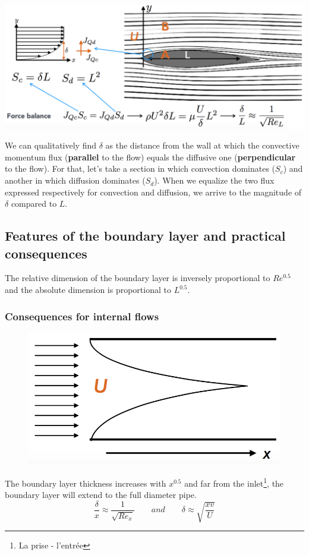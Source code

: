 \begin{center}
	\includegraphics[scale=0.4]{ch1/12}
\end{center}
We can qualitatively find $\delta$ as the distance from the wall at which the convective momentum flux (\textbf{parallel} to the flow) equals the diffusive one (\textbf{perpendicular} to the flow). For that, let's take a section in which convection dominates ($S_c$) and another in which diffusion dominates ($S_d$). When we equalize the two flux expressed respectively for convection and diffusion, we arrive to the magnitude of $\delta$ compared to $L$.
	
\subsection{Features of the boundary layer and practical consequences}
The relative dimension of the boundary layer is inversely proportional to $Re^{0.5}$ and the absolute dimension is proportional to $L^{0.5}$.

\subsubsection{Consequences for internal flows}
\begin{figure}
	\vspace{-5mm}
	\includegraphics[scale=0.3]{ch1/13}
\end{figure}
The boundary layer thickness increases with $x^{0.5}$ and far from the inlet\footnote{La prise - l'entrée}, the boundary layer will extend to the full diameter pipe. 
\begin{equation}
	\frac{\delta}{x} \approx \frac{1}{\sqrt{Re_x}} \qquad and \qquad \delta \approx \sqrt{\frac{xv}{U}}
\end{equation}
	
